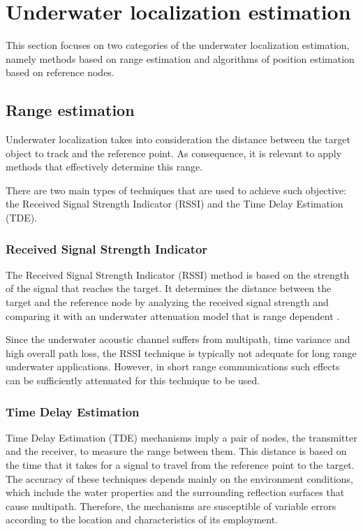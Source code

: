 
\section{Underwater localization estimation}

This section focuses on two categories of the underwater localization estimation, namely methods based on range estimation and algorithms of position estimation based on reference nodes.

\subsection{Range estimation}

Underwater localization takes into consideration the distance between the target object to track and the reference point. As consequence, it is relevant to apply methods that effectively determine this range.

There are two main types of techniques that are used to achieve such objective: the Received Signal Strength Indicator (RSSI) and the Time Delay Estimation (TDE).

\subsubsection{Received Signal Strength Indicator}

The Received Signal Strength Indicator (RSSI) method is based on the strength of the signal that reaches the target. It determines the distance between the target and the reference node by analyzing the received signal strength and comparing it with an underwater attenuation model that is range dependent \cite{ocean-acoust}. 

Since the underwater acoustic channel suffers from multipath, time variance and high overall path loss, the RSSI technique is typically not adequate for long range underwater applications. However, in short range communications such effects can be sufficiently attenuated for this technique to be used.

\subsubsection{Time Delay Estimation}
Time Delay Estimation (TDE) mechanisms imply a pair of nodes, the transmitter and the receiver, to measure the range between them. This distance is based on the time that it takes for a signal to travel from the reference point to the target. The accuracy of these techniques depends mainly on the environment conditions, which include the water properties and the surrounding reflection surfaces that cause multipath. Therefore, the mechanisms are susceptible of variable errors according to the location and characteristics of its employment.

